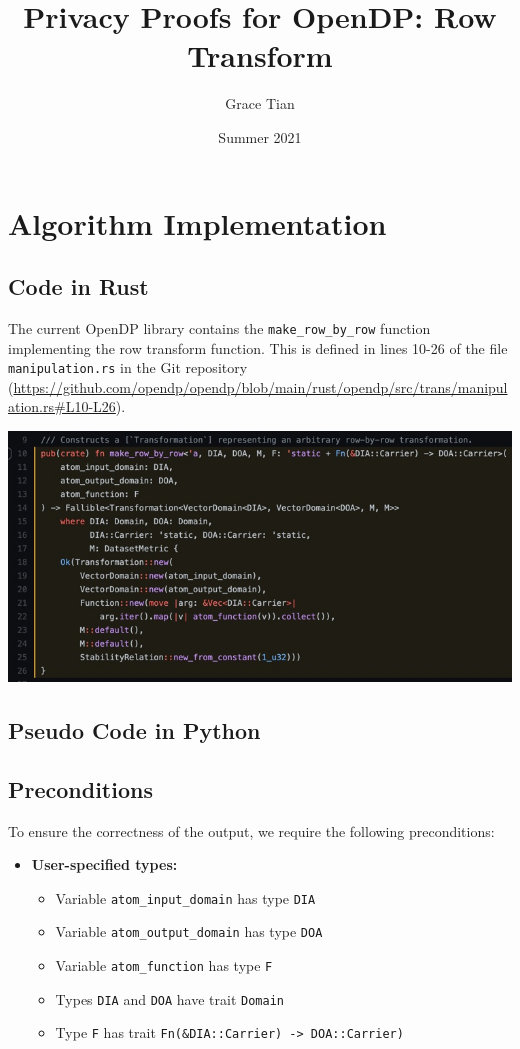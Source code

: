 \documentclass[11pt,a4paper]{article}
\title{Privacy Proofs for OpenDP: Row Transform}
\author{Grace Tian}
\date{Summer 2021}
\begin{document}
\maketitle
\tableofcontents


\section{Algorithm Implementation}
\subsection{Code in Rust}
The current OpenDP library contains the \texttt{make\_row\_by\_row} function implementing the row transform function. This is defined in lines 10-26 of the file \texttt{manipulation.rs} in the Git repository (\url{https://github.com/opendp/opendp/blob/main/rust/opendp/src/trans/manipulation.rs#L10-L26}).

\includegraphics[width=\textwidth]{make_row_by_row.jpg}


\subsection{Pseudo Code in Python} \label{sec:pseudocode}

\subsection*{Preconditions}
To ensure the correctness of the output, we require the following preconditions:

\begin{itemize}
    \item \textbf{User-specified types:}
    \begin{itemize}
        \item Variable \texttt{atom\_input\_domain} has type \texttt{DIA}
        \item Variable \texttt{atom\_output\_domain} has type \texttt{DOA}
        \item Variable \texttt{atom\_function} has type \texttt{F}
        \item Types \texttt{DIA} and \texttt{DOA} have trait \texttt{Domain}
        \item Type \texttt{F} has trait \texttt{Fn(\&DIA::Carrier) -> DOA::Carrier)} 
    \end{itemize}
\end{itemize}
\end{document}
